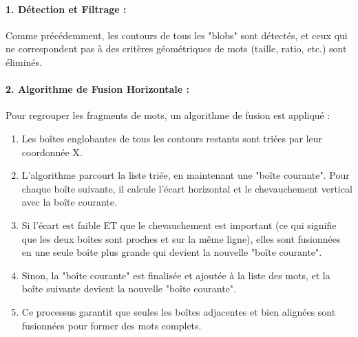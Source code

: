 \documentclass{article}
\begin{document}
\paragraph{1. Détection et Filtrage :} Comme précédemment, les contours de tous les "blobs" sont détectés, et ceux qui ne correspondent pas à des critères géométriques de mots (taille, ratio, etc.) sont éliminés.

\paragraph{2. Algorithme de Fusion Horizontale :} Pour regrouper les fragments de mots, un algorithme de fusion est appliqué :
\begin{enumerate}
    \item Les boîtes englobantes de tous les contours restants sont triées par leur coordonnée X.
    \item L'algorithme parcourt la liste triée, en maintenant une "boîte courante". Pour chaque boîte suivante, il calcule l'écart horizontal et le chevauchement vertical avec la boîte courante.
    \item Si l'écart est faible ET que le chevauchement est important (ce qui signifie que les deux boîtes sont proches et sur la même ligne), elles sont fusionnées en une seule boîte plus grande qui devient la nouvelle "boîte courante".
    \item Sinon, la "boîte courante" est finalisée et ajoutée à la liste des mots, et la boîte suivante devient la nouvelle "boîte courante".
    \item Ce processus garantit que seules les boîtes adjacentes et bien alignées sont fusionnées pour former des mots complets.
\end{enumerate}
\end{document}
